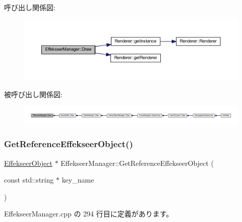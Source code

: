 呼び出し関係図\+:
\nopagebreak
\begin{figure}[H]
\begin{center}
\leavevmode
\includegraphics[width=350pt]{class_effekseer_manager_a0c9155e72b0552e5138e68be682a63a4_cgraph}
\end{center}
\end{figure}
被呼び出し関係図\+:
\nopagebreak
\begin{figure}[H]
\begin{center}
\leavevmode
\includegraphics[width=350pt]{class_effekseer_manager_a0c9155e72b0552e5138e68be682a63a4_icgraph}
\end{center}
\end{figure}
\mbox{\label{class_effekseer_manager_a44878c9abb7f43521c7e8a9700668a28}} 
\subsubsection{\texorpdfstring{Get\+Reference\+Effekseer\+Object()}{GetReferenceEffekseerObject()}}
{\footnotesize\ttfamily \mbox{\hyperlink{class_effekseer_object}{Effekseer\+Object}} $\ast$ Effekseer\+Manager\+::\+Get\+Reference\+Effekseer\+Object (\begin{DoxyParamCaption}\item[{const std\+::string $\ast$}]{key\+\_\+name }\end{DoxyParamCaption})\hspace{0.3cm}{\ttfamily [static]}}



 Effekseer\+Manager.\+cpp の 294 行目に定義があります。

